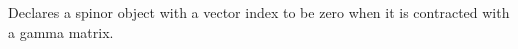 
Declares a spinor object with a vector index to be zero when it is
contracted with a gamma matrix.
